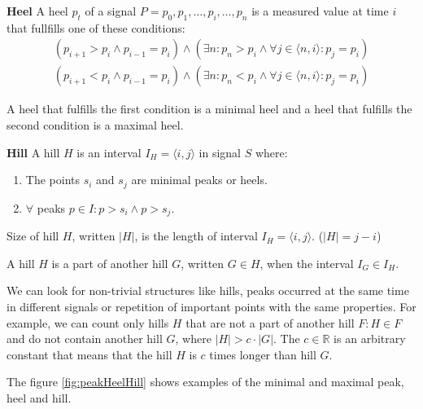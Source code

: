 \begin{definition}{\textbf{Heel}}
    A heel $p_t$ of a signal $P = {p_0, p_1, \dots, p_i, \dots, p_n}$ is a measured value at time $i$ that fullfills one of these conditions:
    \begin{eqnarray}
    (p_{i+1} > p_i \land p_{i-1} = p_i) \land (\exists n : p_n > p_i \land \forall j \in \langle n, i \rangle : p_j = p_i) \\
    (p_{i+1} < p_i \land p_{i-1} = p_i) \land (\exists n : p_n < p_i \land \forall j \in \langle n, i \rangle : p_j = p_i)
    \end{eqnarray}
    
    A heel that fulfills the first condition is a minimal heel and a heel that fulfills the second condition is a maximal heel.
\end{definition}

\begin{definition}{\textbf{Hill}}
    \label{def:hill}
    A hill $H$ is an interval $I_H = \langle i,j \rangle$ in signal $S$ where:
    \begin{enumerate}
        \item The points $s_i$ and $s_j$ are minimal peaks or heels.
        \item $\forall$ peaks $p \in I : p > s_i \land p > s_j$.
    \end{enumerate}
\end{definition}

\begin{remark}
    Size of hill $H$, written $|H|$, is the length of interval $I_H = \langle i,j \rangle$. ($|H| = j - i$)
\end{remark}

\begin{remark}
    A hill $H$ is a part of another hill $G$, written $G \in H$, when the interval $I_G \in I_H$.
\end{remark}

We can look for non-trivial structures like hills, peaks occurred at the same time in different signals or repetition of important points with the same properties. For example, we can count only hills $H$ that are not a part of another hill $F : H \in F$ and do not contain another hill $G$, where $|H| > c \cdot |G|$. The $c \in \mathbb{R}$ is an arbitrary constant that means that the hill $H$ is $c$ times longer than hill $G$.

The figure \ref{fig:peakHeelHill} shows examples of the minimal and maximal peak, heel and hill.

